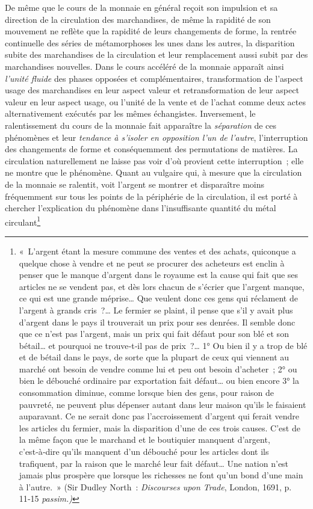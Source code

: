 \documentclass[french,twoside]{book} %
\begin{document}
De même que le cours de la monnaie en général reçoit son impulsion et sa direction de la circulation des marchandises, de même la rapidité de son mouvement ne reflète que la rapidité de leurs changements de forme, la rentrée continuelle des séries de métamorphoses les unes dans les autres, la disparition subite des marchandises de la circulation et leur remplacement aussi subit par des marchandises nouvelles. Dans le cours accéléré de la monnaie apparaît ainsi \emph{l’unité fluide} des phases opposées et complémentaires, transformation de l’aspect usage des marchandises en leur aspect valeur et retransformation de leur aspect valeur en leur aspect usage, ou l’unité de la vente et de l’achat comme deux actes alternativement exécutés par les mêmes échangistes. Inversement, le ralentissement du cours de la monnaie fait apparaître la \emph{séparation} de ces phénomènes et leur \emph{tendance à s’isoler en opposition l’un de l’autre}, l’interruption des changements de forme et conséquemment des permutations de matières. La circulation naturellement ne laisse pas voir d’où provient cette interruption ; elle ne montre que le phénomène. Quant au vulgaire qui, à mesure que la circulation de la monnaie se ralentit, voit l’argent se montrer et disparaître moins fréquemment sur tous les points de la périphérie de la circulation, il est porté à chercher l’explication du phénomène dans l’insuffisante quantité du métal circulant\footnote{ \noindent « L’argent étant la mesure commune des ventes et des achats, quiconque a quelque chose à vendre et ne peut se procurer des acheteurs est enclin à penser que le manque d’argent dans le royaume est la cause qui fait que ses articles ne se vendent pas, et dès lors chacun de s’écrier que l’argent manque, ce qui est une grande méprise… Que veulent donc ces gens qui réclament de l’argent à grands cris ?… Le fermier se plaint, il pense que s’il y avait plus d’argent dans le pays il trouverait un prix pour ses denrées. Il semble donc que ce n’est pas l’argent, mais un prix qui fait défaut pour son blé et son bétail… et pourquoi ne trouve‑t‑il pas de prix ?… 1° Ou bien il y a trop de blé et de bétail dans le pays, de sorte que la plupart de ceux qui viennent au marché ont besoin de vendre comme lui et peu ont besoin d’acheter ; 2° ou bien le débouché ordinaire par exportation fait défaut… ou bien encore 3° la consommation diminue, comme lorsque bien des gens, pour raison de pauvreté, ne peuvent plus dépenser autant dans leur maison qu’ils le faisaient auparavant. Ce ne serait donc pas l’accroissement d’argent qui ferait vendre les articles du fermier, mais la disparition d’une de ces trois causes. C’est de la même façon que le marchand et le boutiquier manquent d’argent, c’est‑à‑dire qu’ils manquent d’un débouché pour les articles dont ils trafiquent, par la raison que le marché leur fait défaut… Une nation n’est jamais plus prospère que lorsque les richesses ne font qu’un bond d’une main à l’autre. » (Sir Dudley North : \emph{Discourses upon Trade}, London, 1691, p. 11‑15 \emph{passim.)}\par
}
\end{document}
